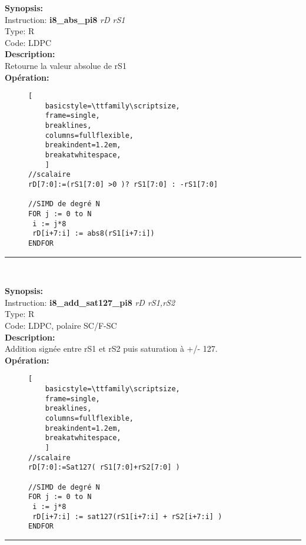 {\scriptsize
\textbf{Synopsis:}\\
Instruction: \textbf{i8\_abs\_pi8 } \textit{rD rS1}\\
Type: R\\
Code: LDPC\\
\textbf{Description:}\\
Retourne la valeur absolue de rS1\\
\textbf{Opération:}\\
    \begin{figure}[H]
    \begin{lstlisting}[
    basicstyle=\ttfamily\scriptsize,
    frame=single,
    breaklines,
    columns=fullflexible,
    breakindent=1.2em,
    breakatwhitespace,
    ]
//scalaire
rD[7:0]:=(rS1[7:0] >0 )? rS1[7:0] : -rS1[7:0]
    
//SIMD de degré N
FOR j := 0 to N    
 i := j*8    
 rD[i+7:i] := abs8(rS1[i+7:i]) 
ENDFOR
\end{lstlisting}
\end{figure}
}
\rule{8cm}{0.4pt}\\
{\scriptsize
\textbf{Synopsis:}\\
Instruction: \textbf{i8\_add\_sat127\_pi8 } \textit{rD rS1,rS2}\\
Type: R\\
Code: LDPC, polaire SC/F-SC\\
\textbf{Description:}\\
Addition signée entre rS1 et rS2 puis saturation à +/- 127.\\
\textbf{Opération:}\\
    \begin{figure}[H]
    \begin{lstlisting}[
    basicstyle=\ttfamily\scriptsize,
    frame=single,
    breaklines,
    columns=fullflexible,
    breakindent=1.2em,
    breakatwhitespace,
    ]
//scalaire
rD[7:0]:=Sat127( rS1[7:0]+rS2[7:0] )
    
//SIMD de degré N
FOR j := 0 to N   
 i := j*8    
 rD[i+7:i] := sat127(rS1[i+7:i] + rS2[i+7:i] ) 
ENDFOR
\end{lstlisting}
\end{figure}
}
\rule{8cm}{0.4pt}\\

